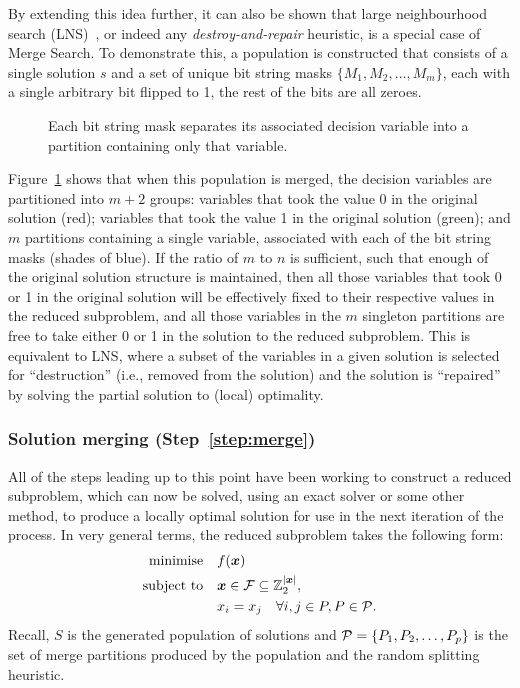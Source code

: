 \documentclass[journal]{IEEEtran}
\begin{document}
By extending this idea further, it can also be shown that large neighbourhood search (LNS)~\cite{Pisinger2010}, or indeed any \emph{destroy-and-repair} heuristic, is a special case of Merge Search. To demonstrate this, a population is constructed that consists of a single solution $s$ and a set of unique bit string masks $\{M_1,M_2,\dots,M_m\}$, each with a single arbitrary bit flipped to 1, the rest of the bits are all zeroes. 

\begin{figure}[h]
\centering
{}
\caption[Demonstrtation that Merge Search is equivalent to LNS]
       {Each bit string mask separates its associated decision variable into a partition containing only that variable.}
\label{fig:lns-merge}
\end{figure}

Figure~\ref{fig:lns-merge} shows that when this population is merged, the decision variables are partitioned into $m+2$ groups: variables that took the value 0 in the original solution (red); variables that took the value 1 in the original solution (green); and $m$ partitions containing a single variable, associated with each of the bit string masks (shades of blue). If the ratio of $m$ to $n$ is sufficient, such that enough of the original solution structure is maintained, then all those variables that took 0 or 1 in the original solution will be effectively fixed to their respective values in the reduced subproblem, and all those variables in the $m$ singleton partitions are free to take either 0 or 1 in the solution to the reduced subproblem. This is equivalent to LNS, where a subset of the variables in a given solution is selected for ``destruction'' (i.e., removed from the solution) and the solution is ``repaired'' by solving the partial solution to (local) optimality. 

\subsubsection*{Solution merging (Step~\ref{step:merge})}
All of the steps leading up to this point have been working to construct a reduced subproblem, which can now be solved, using an exact solver or some other method, to produce a locally optimal solution for use in the next iteration of the process. In very general terms, the reduced subproblem takes the following form:
\begin{align}
              \Min \quad & f(\V{x})\label{eq:merge_group}\\
              \ST \quad  &\V{x} \in \S{F} \subseteq \Int_2^{|\V{x}|},\nonumber\\
              & x_i = x_j \quad \forall i,j \in P, P \in {\cal P}.\nonumber
\end{align}
Recall, $S$ is the generated population of solutions and ${\cal P} = \{P_1,P_2,\dots,P_p\}$ is the set of merge partitions produced by the population and the random splitting heuristic.
\end{document}
